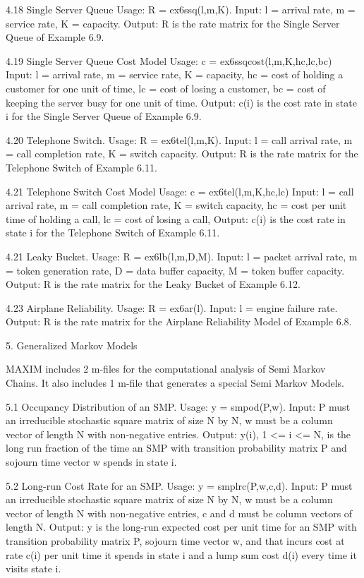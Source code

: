 4.18 Single Server Queue
Usage:  R = ex6ssq(l,m,K).
Input: l =  arrival rate,
m =  service rate,
K = capacity.
Output: R is the rate matrix for the Single Server Queue of Example  6.9.

4.19 Single Server Queue Cost Model
Usage:  c = ex6ssqcost(l,m,K,hc,lc,bc)
Input: l =  arrival rate,
m =  service rate,
K = capacity,
hc =  cost of holding a customer for one unit of time,
lc =   cost of losing a customer,
bc =  cost of keeping the server busy for one unit of time.
Output: c(i) is the cost rate in state i for the Single Server Queue of Example  6.9.


4.20 Telephone Switch.
Usage:  R = ex6tel(l,m,K).
Input: l =  call arrival rate,
m =  call completion rate,
K = switch capacity.
Output: R is the rate matrix for the Telephone Switch  of Example  6.11.

4.21 Telephone Switch Cost Model
Usage:  c = ex6tel(l,m,K,hc,lc)
Input: l =  call arrival rate,
m =  call completion rate,
K = switch capacity,
hc = cost per unit time of holding a call,
lc =  cost of losing a call,
Output: c(i) is the cost rate in state i for the Telephone Switch  of Example  6.11.

4.21 Leaky Bucket.
Usage:  R = ex6lb(l,m,D,M).
Input: l =  packet arrival rate,
m =  token generation rate,
D = data buffer capacity,
M = token buffer capacity.
Output: R is the rate matrix for the Leaky Bucket   of Example  6.12.

4.23 Airplane Reliability.
Usage:  R = ex6ar(l).
Input: l =  engine failure rate.
Output: R is the rate matrix for the Airplane Reliability Model    of Example  6.8.


 
5. Generalized Markov Models


MAXIM includes 2 m-files for the computational analysis of Semi Markov Chains. It also includes 1 m-file that generates a special Semi Markov Models.

5.1 Occupancy Distribution of an SMP.
Usage:  y = smpod(P,w).
Input: P must an irreducible stochastic square matrix of size N by N, w must be a column vector of length N with non-negative entries. 
Output:  y(i),  1 <= i <= N, is the long run fraction  of the time an SMP with transition probability matrix P and sojourn time vector w spends in state i.

5.2 Long-run Cost Rate for an SMP.
Usage:  y = smplrc(P,w,c,d).
Input: P must an irreducible stochastic square matrix of size N by N, w must be a column vector of length N with non-negative entries, c and d must be column vectors of length N. 
Output:  y is the long-run expected cost per unit time for an SMP with transition probability matrix P, sojourn time vector w, and that incurs cost at rate  c(i) per unit  time it spends in state i and a lump sum cost d(i) every time it visits state i. 
 
